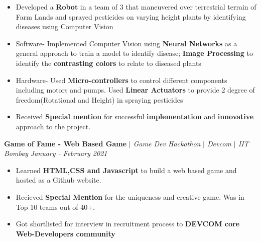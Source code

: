 \documentclass[a4paper,11pt]{article}
\begin{document}
\vspace{-10pt}
\begin{itemize}[itemsep = -1.0mm, leftmargin = 0.2in]
\item Developed a \textbf{Robot} in a team of 3 that maneuvered over terrestrial terrain of Farm Lands and sprayed pesticides on varying height plants by identifying diseases using Computer Vision
\item Software- Implemented Computer Vision using \textbf{Neural Networks} as a general approach to train a model to identify disease; \textbf{Image Processing} to identify the \textbf{contrasting colors} to relate to diseased plants
\item Hardware- Used \textbf{Micro-controllers} to control different components including motors and pumps. Used \textbf{Linear Actuators} to provide 2 degree of freedom(Rotational and Height) in spraying pesticides
\item Received \textbf{Special mention} for successful \textbf{implementation} and \textbf{innovative} approach to the project. 
\end{itemize}


\textbf{\large Game of Fame - Web Based Game}
\textit{$\vert$ Game Dev Hackathon}
\textit{\small $\vert$ Devcom $\vert$ IIT Bombay}
\hfill\textit{\small January - February 2021}

\vspace{-1pt}


\vspace{-10pt}
\begin{itemize}[itemsep = -1.0mm, leftmargin = 0.2in]
\item Learned \textbf{HTML,CSS and Javascript} to build a web based game and hosted as a Github website. 
\item Recieved \textbf{Special Mention} for the uniqueness and creative game. Was in Top 10 teams out of 40+. 
\item Got shortlisted for interview in recruitment process to \textbf{DEVCOM core Web-Developers community}
\end{itemize}
\end{document}
